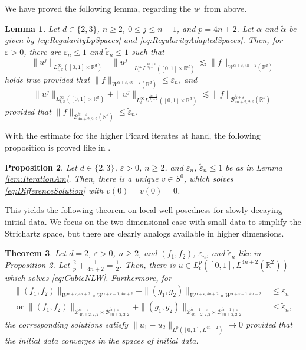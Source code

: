 \documentclass{amsart}
\newtheorem{theorem}{Theorem}[section]
\newtheorem{lemma}[theorem]{Lemma}
\newtheorem{proposition}[theorem]{Proposition}
\theoremstyle{definition}
\newcommand{\R}{\mathbb{R}}
\newcommand {\Rd}{\mathbb{R}^{d}}
\newcommand {\veps}{\varepsilon}
\numberwithin{equation}{section}
\begin{document}
We have proved the following lemma, regarding the $u^{j}$ from above.
\begin{lemma}
Let $d \in \{ 2, 3 \}$, $n \geq 2$, $0 \leq j \leq n-1$, and $p = 4n+2$. Let $\alpha$ and $\tilde{\alpha}$ be given by \eqref{eq:RegularityLpSpaces} and \eqref{eq:RegularityAdaptedSpaces}. Then, for $\varepsilon >0$, there are $\varepsilon_n \leq 1$ and $\tilde{\varepsilon}_n \leq 1$ such that
\begin{equation*}
\| u^j \|_{L^\infty_{t,x}([0,1] \times \R^d)} + \| u^j \|_{L_t^\infty L^{\frac{4n+2}{2j+1}}([0,1] \times \R^d)} \lesssim \| f \|_{W^{\alpha+\veps,4n+2}(\R^d)}
\end{equation*}
holds true provided that $\| f \|_{W^{\alpha+\veps,4n+2}(\Rd)} \leq \varepsilon_n$, and
\begin{equation*}
\| u^j \|_{L^\infty_{t,x}([0,1] \times \R^d)} + \| u^j \|_{L^\infty_t L^{\frac{4n+2}{2j+1}}([0,1] \times \R^d)} \lesssim \| f \|_{\mathcal{B}^{\tilde{\alpha}+\varepsilon}_{4n+2,2,2}(\R^d)}
\end{equation*}
provided that $\| f \|_{\mathcal{B}^{\tilde{\alpha}+\varepsilon}_{4n+2,2,2}(\R^d)} \leq \tilde{\varepsilon}_n$.
\end{lemma}
With the estimate for the higher Picard iterates at hand, the following proposition is proved like in \cite[Proposition~4.6]{Schippa2022}.

\begin{proposition}
\label{prop:ExistenceDifferenceSolution}
Let $d \in \{2,3\}$, $\varepsilon > 0$, $n \geq 2$, and $\varepsilon_n$, $\tilde{\varepsilon}_n \leq 1$ be as in Lemma \ref{lem:IterationAm}. Then, there is a unique $v \in S^0$, which solves \eqref{eq:DifferenceSolution} with $v(0) = \dot{v}(0) = 0$.
\end{proposition}
This yields the following theorem on local well-posedness for slowly decaying initial data. We focus on the two-dimensional case with small data to simplify the Strichartz space, but there are clearly analogs available in higher dimensions.
\begin{theorem}
\label{thm:SlowlyDecayingData}
Let $d=2$, $\varepsilon > 0$, $n \geq 2$, and $(f_1,f_2)$, $\varepsilon_n$, and $\tilde{\varepsilon}_n$ like in Proposition \ref{prop:ExistenceDifferenceSolution}. Let $\frac{2}{p} + \frac{1}{4n+2} = \frac{1}{2}$. Then, there is $u \in L_t^p([0,1],L^{4n+2}(\R^2))$ which solves \eqref{eq:CubicNLW}. Furthermore, for 
\begin{align*}
\| (f_1,f_2) \|_{W^{\alpha+\veps,4n+2} \times W^{\alpha+\veps-1,4n+2}} + \| (g_1,g_2) \|_{W^{\alpha+\veps,4n+2} \times W^{\alpha+\veps-1,4n+2}} &\leq \varepsilon_n \\
\text{ or } 
\| (f_1,f_2) \|_{\mathcal{B}^{\tilde{\alpha}+\varepsilon}_{4n+2,2,2} \times \mathcal{B}^{\tilde{\alpha}+\varepsilon}_{4n+2,2,2}} + \| (g_1,g_2) \|_{\mathcal{B}^{\tilde{\alpha}-1+\varepsilon}_{4n+2,2,2} \times \mathcal{B}^{\tilde{\alpha}-1+\varepsilon}_{4n+2,2,2}} &\leq \tilde{\varepsilon}_n,
\end{align*}
the corresponding solutions satisfy $\| u_1 - u_2 \|_{L^p([0,1],L^{4n+2})} \to 0$ provided that the initial data converges in the spaces of initial data.
\end{theorem}
\end{document}
